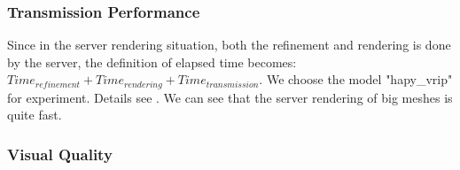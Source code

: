\subsubsection{Transmission Performance}
\label{section:servertransperf}
Since in the server rendering situation, both the refinement and rendering is done by the server, the definition of elapsed time becomes: $Time_{refinement}+Time_{rendering}+Time_{transmission}$. We choose the model "hapy\_vrip" for experiment. Details see . We can see that the server rendering of big meshes is quite fast. 



\subsubsection{Visual Quality}
\label{section:servervisualquality}

